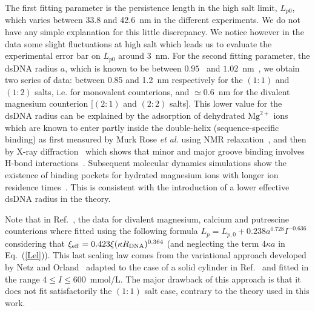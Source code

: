\documentclass[aps,pre,twocolumn]{revtex4}
\def\eq#1{Eq.~(\ref{#1})}
\begin{document}
The first fitting parameter is the persistence length in the high salt limit, $L_{p0}$, which varies between 33.8 and 42.6~nm in the different experiments. We do not have any simple explanation for this little discrepancy. We notice however in the data some slight fluctuations at high salt which leads us to evaluate the experimental error bar on $L_{p0}$ around 3~nm. 
%
For the second fitting parameter, the dsDNA radius $a$, which is known to be between $0.95$~\cite{Shabarova} and $1.02$~nm~\cite{Mandelkern}, we obtain two series of data: between 0.85 and 1.2~nm respectively for the $(1:1)$ and $(1:2)$ salts, i.e. for monovalent counterions, and $\simeq 0.6$~nm for the divalent magnesium counterion [$(2:1)$ and $(2:2)$ salts]. This lower value for the dsDNA radius can be explained by the adsorption of dehydrated $\mathrm{Mg}^{2+}$ ions which are known to enter partly inside the double-helix (sequence-specific binding) as first measured by Murk Rose \textit{et al.} using NMR relaxation~\cite{Rose1980}, and then by X-ray diffraction~\cite{Subirana2003} which shows that minor and major groove binding involves H-bond interactions~\cite{Chiu2000}. Subsequent molecular dynamics simulations show the existence of binding pockets for hydrated magnesium ions with longer ion residence times~\cite{Pan2014}. This is consistent with the introduction of a lower effective dsDNA radius in the theory.

Note that in Ref.~\cite{PRL2019}, the data for divalent magnesium, calcium and putrescine counterions where fitted using the following formula $L_p = L_{p,0} + 0.238 a^{0.728} I^{-0.636}$ considering that $\xi_{\rm eff} = 0.423 \xi (\kappa R_{\rm DNA})^{0.364}$ (and neglecting the term $4\kappa a$ in \eq{Lel}). This last scaling law comes from the variational approach developed by Netz and Orland~\cite{Netz2003} adapted to the case of a solid cylinder in Ref.~\cite{Macromolecules} and fitted in the range $4\leq I\leq 600$~mmol/L. The major drawback of this approach is that it does not fit satisfactorily the $(1:1)$ salt case, contrary to the theory used in this work.
\end{document}
